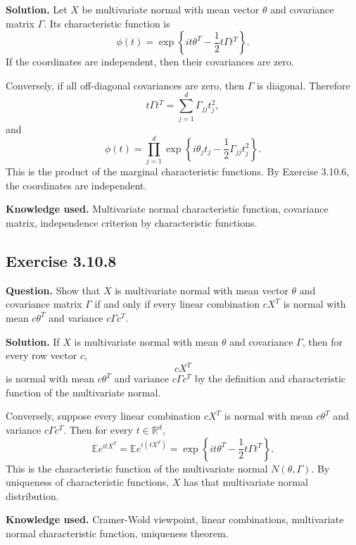 \documentclass[11pt]{article}
\newcommand{\E}{\mathbb{E}}
\begin{document}
\textbf{Solution.}
Let $X$ be multivariate normal with mean vector $\theta$ and covariance
matrix $\Gamma$.  Its characteristic function is
\[
  \phi(t)
  =
  \exp\left\{
    i t\theta^T-\frac12 t\Gamma t^T
  \right\}.
\]
If the coordinates are independent, then their covariances are zero.

Conversely, if all off-diagonal covariances are zero, then $\Gamma$ is
diagonal.  Therefore
\[
  t\Gamma t^T=\sum_{j=1}^d \Gamma_{jj}t_j^2,
\]
and
\[
  \phi(t)
  =
  \prod_{j=1}^d
  \exp\left\{
    i\theta_jt_j-\frac12\Gamma_{jj}t_j^2
  \right\}.
\]
This is the product of the marginal characteristic functions.  By
Exercise 3.10.6, the coordinates are independent.

\textbf{Knowledge used.}
Multivariate normal characteristic function, covariance matrix,
independence criterion by characteristic functions.

\subsection*{Exercise 3.10.8}
\textbf{Question.}
Show that $X$ is multivariate normal with mean vector $\theta$ and
covariance matrix $\Gamma$ if and only if every linear combination
$cX^T$ is normal with mean $c\theta^T$ and variance $c\Gamma c^T$.

\textbf{Solution.}
If $X$ is multivariate normal with mean $\theta$ and covariance
$\Gamma$, then for every row vector $c$,
\[
  cX^T
\]
is normal with mean $c\theta^T$ and variance $c\Gamma c^T$ by the
definition and characteristic function of the multivariate normal.

Conversely, suppose every linear combination $cX^T$ is normal with mean
$c\theta^T$ and variance $c\Gamma c^T$.  Then for every
$t\in\mathbb R^d$,
\[
  \E e^{itX^T}
  =
  \E e^{i(tX^T)}
  =
  \exp\left\{
    i t\theta^T-\frac12 t\Gamma t^T
  \right\}.
\]
This is the characteristic function of the multivariate normal
$N(\theta,\Gamma)$.  By uniqueness of characteristic functions,
$X$ has that multivariate normal distribution.

\textbf{Knowledge used.}
Cramer-Wold viewpoint, linear combinations, multivariate normal
characteristic function, uniqueness theorem.
\end{document}
